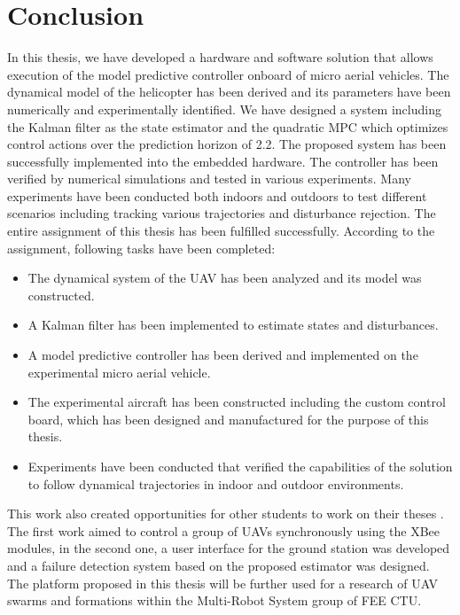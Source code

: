 \section{Conclusion}

In this thesis, we have developed a hardware and software solution that allows execution of the model predictive controller onboard of micro aerial vehicles. The dynamical model of the helicopter has been derived and its parameters have been numerically and experimentally identified. We have designed a system including the Kalman filter as the state estimator and the quadratic MPC which optimizes control actions over the prediction horizon of 2.2. The proposed system has been successfully implemented into the embedded hardware. The controller has been verified by numerical simulations and tested in various experiments. Many experiments have been conducted both indoors and outdoors to test different scenarios including tracking various trajectories and disturbance rejection. The entire assignment of this thesis has been fulfilled successfully. According to the assignment, following tasks have been completed:

\begin{itemize}
\item The dynamical system of the UAV has been analyzed and its model was constructed.
\item A Kalman filter has been implemented to estimate states and disturbances.
\item A model predictive controller has been derived and implemented on the experimental micro aerial vehicle.
\item The experimental aircraft has been constructed including the custom control board, which has been designed and manufactured for the purpose of this thesis.
\item Experiments have been conducted that verified the capabilities of the solution to follow dynamical trajectories in indoor and outdoor environments.
\end{itemize}

This work also created opportunities for other students to work on their theses \citep{klucka2015, fiedler2015}. The first work aimed to control a group of UAVs synchronously using the XBee modules, in the second one, a user interface for the ground station was developed and a failure detection system based on the proposed estimator was designed. The platform proposed in this thesis will be further used for a research of UAV swarms and formations within the Multi-Robot System group of FEE CTU.

